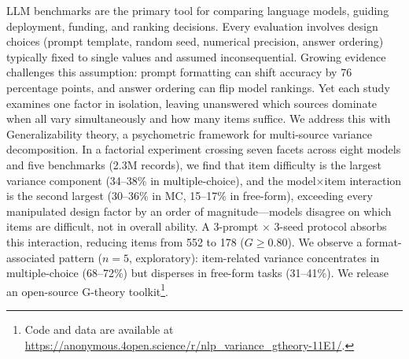 LLM benchmarks are the primary tool for comparing language models, guiding deployment, funding, and ranking decisions. Every evaluation involves design choices (prompt template, random seed, numerical precision, answer ordering) typically fixed to single values and assumed inconsequential. Growing evidence challenges this assumption: prompt formatting can shift accuracy by 76 percentage points, and answer ordering can flip model rankings. Yet each study examines one factor in isolation, leaving unanswered which sources dominate when all vary simultaneously and how many items suffice. We address this with Generalizability theory, a psychometric framework for multi-source variance decomposition. In a factorial experiment crossing seven facets across eight models and five benchmarks (2.3M records), we find that item difficulty is the largest variance component (34--38\% in multiple-choice), and the model$\times$item interaction is the second largest (30--36\% in MC, 15--17\% in free-form), exceeding every manipulated design factor by an order of magnitude---models disagree on which items are difficult, not in overall ability. A 3-prompt $\times$ 3-seed protocol absorbs this interaction, reducing items from 552 to 178 ($G \geq 0.80$). We observe a format-associated pattern ($n = 5$, exploratory): item-related variance concentrates in multiple-choice (68--72\%) but disperses in free-form tasks (31--41\%). We release an open-source G-theory toolkit\footnote{Code and data are available at \url{https://anonymous.4open.science/r/nlp_variance_gtheory-11E1/}.}.

